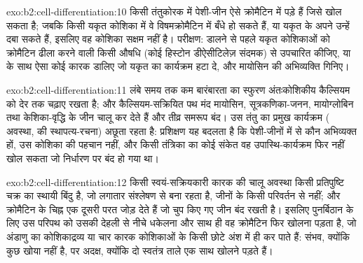 \begin{solution}{exo:b2:cell-differentiation:10}
किसी तंतुकोरक में पेशी-जीन ऐसे क्रोमैटिन में पड़े हैं जिसे  खोल
सकता है; जबकि किसी यकृत कोशिका में वे विषमक्रोमैटिन में बँधे हो सकते
हैं, या यकृत के अपने  उन्हें दबा सकते हैं, इसलिए वह कोशिका
सक्षम नहीं है। परीक्षण:  डालने से पहले यकृत कोशिकाओं को क्रोमैटिन
ढीला करने वाली किसी औषधि (कोई हिस्टोन डीऐसीटिलेज़ संदमक) से उपचारित
कीजिए, या  के साथ ऐसा कोई कारक डालिए जो यकृत का कार्यक्रम हटा दे,
और मायोसिन की अभिव्यक्ति गिनिए।
\end{solution}

\begin{solution}{exo:b2:cell-differentiation:11}
लंबे समय तक कम बारंबारता का स्फुरण अंतःकोशिकीय कैल्सियम को
देर तक चढ़ाए रखता है; और कैल्सियम-सक्रियित पथ मंद मायोसिन,
सूत्रकणिका-जनन, मायोग्लोबिन तथा केशिका-वृद्धि के जीन चालू कर देते हैं
और तीव्र समरूप बंद। उस तंतु का प्रमुख
कार्यक्रम ( अवस्था,  की स्थापत्य-रचना) अछूता रहता है:
प्रशिक्षण यह बदलता है कि पेशी-जीनों में से कौन अभिव्यक्त हों, उस कोशिका
की पहचान नहीं, और किसी तंत्रिका का कोई संकेत वह उपास्थि-कार्यक्रम फिर
नहीं खोल सकता जो निर्धारण पर बंद हो गया था।
\end{solution}

\begin{solution}{exo:b2:cell-differentiation:12}
किसी स्वयं-सक्रियकारी कारक की चालू अवस्था किसी प्रतिपुष्टि चक्र का
स्थायी बिंदु है, जो लगातार संश्लेषण से बना रहता है, जीनों के किसी
परिवर्तन से नहीं; और क्रोमैटिन के चिह्न एक दूसरी परत जोड़ देते हैं जो
चुप किए गए जीन बंद रखती है। इसलिए पुनर्बिठान के लिए उस परिपथ को उसकी
देहली से नीचे धकेलना और साथ ही वह क्रोमैटिन फिर खोलना पड़ता है, जो
अंडाणु का कोशिकाद्रव्य या चार कारक कोशिकाओं के किसी छोटे अंश में ही कर
पाते हैं: संभव, क्योंकि कुछ खोया नहीं है, पर अदक्ष, क्योंकि
दो स्वतंत्र ताले एक साथ खोलने पड़ते हैं।
\end{solution}

